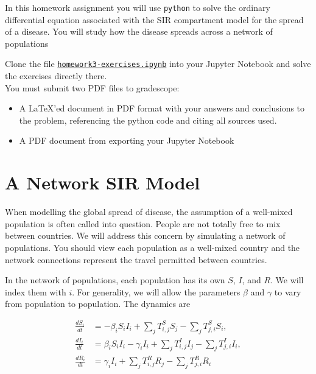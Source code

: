 \documentclass[letter]{article}
\newcommand{\setheader}[6]{
	\lhead{{\sc #1}\\{\sc #2}}%
	\rhead{
		{\bf #3} 
		\ifthenelse{\equal{#4}{}}{}{(#4)}\\
		{\bf #5} 
		\ifthenelse{\equal{#6}{}}{}{(#6)}%
	}
}
\begin{document}
	\setheader{APM348}{Homework 3}{Due: 5:59pm March 8}{}{}{}


In this homework assignment you will use \verb|python| to solve the ordinary differential equation associated with the SIR compartment model for the spread of a disease. You will study how the disease spreads across a network of populations

Clone the file \href{https://utoronto.syzygy.ca/jupyter/user-redirect/git-pull?repo=https://github.com/bigfatbernie/IBLMathModeling&subPath=homeworks/homework3/homework3-exercises.ipynb}{\tt homework3-exercises.ipynb} into your Jupyter Notebook and solve the exercises directly there. \\

You must submit two PDF files to gradescope:
\begin{itemize}
	\item A \LaTeX'ed document in PDF format with your answers and conclusions to the problem, referencing the python code and citing all sources used.
	\item A PDF document from exporting your Jupyter Notebook
\end{itemize}



\section{A Network SIR Model}


When modelling the global spread of disease, the assumption of a well-mixed population is often called into question. People are not totally free to mix between countries. We will address this concern by simulating a network of populations. You should view each population as a well-mixed country and the network connections represent the travel permitted between countries.


In the network of populations, each population has its own $S$, $I$, and $R$. We will index them with $i$. For generality, we will allow the parameters $\beta$ and $\gamma$ to vary from population to population. The dynamics are

\begin{align}
	\frac{dS_i}{dt} & = -\beta_i S_i I_i + \sum_{j} T^S_{i,j} S_j - \sum_j T^S_{j,i} S_i, \label{SIR:S}\\
	\frac{dI_i}{dt} & = 	\beta_i S_i I_i - \gamma_i I_i + \sum_{j} T^I_{i,j} I_j - \sum_j T^I_{j,i} I_i, \label{SIR:I} \\
	\frac{dR_i}{dt} & = \gamma_i I_i + \sum_{j} T^R_{i,j} R_j - \sum_j T^R_{j,i} R_i \label{SIR:R}
\end{align}
\end{document}
